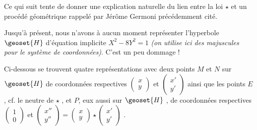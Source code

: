 Ce qui suit tente de donner une explication naturelle du lien entre la loi $\star$ et un procédé géométrique rappelé par Jérôme Germoni précédemment cité.


\bigskip

Jusqu'à présent, nous n'avons à aucun moment représenter l'hyperbole $\geoset{H}$  d'équation implicite $X^2 - 8 Y^2 = 1$ \textit{(on utilise ici des majuscules pour le système de coordonnées)}. C'est un peu dommage !


\medskip

Ci-dessous se trouvent quatre représentations avec deux points $M$ et $N$ sur $\geoset{H}$ de coordonnées respectives 
$\begin{pmatrix}
  x \\ 
  y 
\end{pmatrix}$
et
$\begin{pmatrix} 
  x' \\ 
  y' 
\end{pmatrix}$
ainsi que les points $E$ , cf. le neutre de $\star$ , et $P$, eux aussi sur $\geoset{H}$ , de coordonnées respectives 
$\begin{pmatrix}
  1 \\ 
  0 
\end{pmatrix}$
et
$\begin{pmatrix} 
  x'' \\ 
  y''
\end{pmatrix}
=
\begin{pmatrix}
  x \\ 
  y 
\end{pmatrix}
\star
\begin{pmatrix} 
  x' \\ 
  y'
\end{pmatrix}$ .


\bigskip


